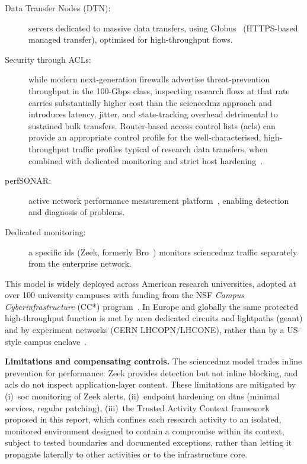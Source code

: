 \begin{description}
    \item[Data Transfer Nodes (DTN):] servers dedicated to massive data
    transfers, using Globus~\cite{globus} (HTTPS-based managed transfer),
    optimised for high-throughput flows.
    \item[Security through ACLs:] while modern next-generation firewalls
    advertise threat-prevention throughput in the 100-Gbps class,
    inspecting research flows at that rate carries substantially higher
    cost than the \gls{sciencedmz} approach and
    introduces latency, jitter, and state-tracking overhead detrimental to
    sustained bulk transfers. Router-based access control lists (\gls{acl}s)
    can provide an appropriate control profile for the well-characterised,
    high-throughput traffic profiles typical of research data transfers,
    when combined with dedicated monitoring and strict host
    hardening~\cite{dart2013}.
    \item[perfSONAR:] active network performance measurement
    platform~\cite{perfsonar}, enabling detection and diagnosis of
    problems.
    \item[Dedicated monitoring:] a specific \gls{ids} (Zeek, formerly Bro~\cite{zeek})
    monitors \gls{sciencedmz} traffic separately from the enterprise network.
\end{description}

This model is widely deployed across American research universities,
adopted at over 100 university campuses with funding from the NSF \emph{Campus
Cyberinfrastructure} (CC*) program~\cite{esnet-history,nsf-cc}. In Europe
and globally the same protected high-throughput function is met by
\gls{nren} dedicated circuits and lightpaths (\gls{geant}) and by
experiment networks (CERN LHCOPN/LHCONE), rather than by a US-style
campus enclave~\cite{geant,cern-lhcone}.

\smallskip\noindent\textbf{Limitations and compensating controls.}
The \gls{sciencedmz} model trades inline prevention for performance: Zeek
provides detection but not inline blocking, and \gls{acl}s do not inspect
application-layer content. These limitations are mitigated by (i)~\gls{soc}
monitoring of Zeek alerts, (ii)~endpoint hardening on \gls{dtn}s (minimal
services, regular patching), (iii)~the Trusted Activity Context
framework proposed in this report, which confines each research
activity to an isolated, monitored environment designed to contain a
compromise within its context, subject to tested boundaries and
documented exceptions, rather than letting it propagate laterally to
other activities or to the infrastructure core.

